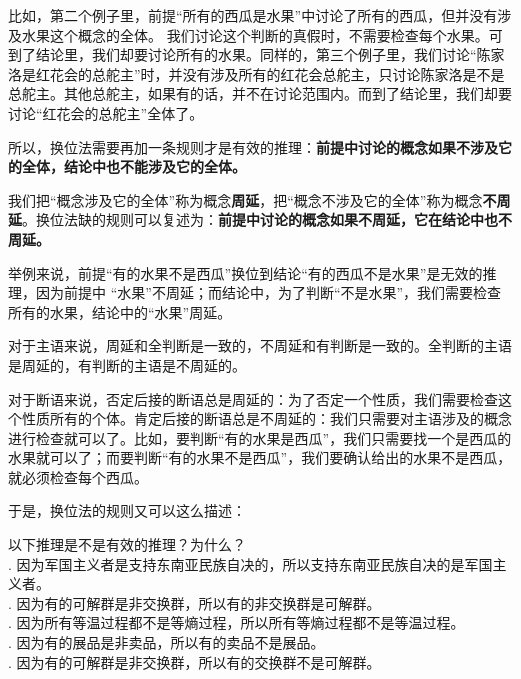\documentclass[12pt,UTF8]{ctexbook}
\begin{document}
比如，第二个例子里，前提“所有的西瓜是水果”中讨论了所有的西瓜，但并没有涉及水果这个概念的全体。
我们讨论这个判断的真假时，不需要检查每个水果。可到了结论里，我们却要讨论所有的水果。同样的，第三个例子里，我们讨论“陈家洛是红花会的总舵主”时，并没有涉及所有的红花会总舵主，只讨论陈家洛是不是总舵主。其他总舵主，如果有的话，并不在讨论范围内。而到了结论里，我们却要讨论“红花会的总舵主”全体了。

所以，换位法需要再加一条规则才是有效的推理：\textbf{前提中讨论的概念如果不涉及它的全体，结论中也不能涉及它的全体。}

我们把“概念涉及它的全体”称为概念\textbf{周延}，把“概念不涉及它的全体”称为概念\textbf{不周延}。换位法缺的规则可以复述为：\textbf{前提中讨论的概念如果不周延，它在结论中也不周延。}

举例来说，前提“有的水果不是西瓜”换位到结论“有的西瓜不是水果”是无效的推理，因为前提中
“水果”不周延；而结论中，为了判断“不是水果”，我们需要检查所有的水果，结论中的“水果”周延。

对于主语来说，周延和全判断是一致的，不周延和有判断是一致的。全判断的主语是周延的，有判断的主语是不周延的。

对于断语来说，否定后接的断语总是周延的：为了否定一个性质，我们需要检查这个性质所有的个体。肯定后接的断语总是不周延的：我们只需要对主语涉及的概念进行检查就可以了。比如，要判断“有的水果是西瓜”，我们只需要找一个是西瓜的水果就可以了；而要判断“有的水果不是西瓜”，我们要确认给出的水果不是西瓜，就必须检查每个西瓜。

于是，换位法的规则又可以这么描述：
\begin{center}
\end{center}

\begin{xt}\label{xt:2b-1-0}
    以下推理是不是有效的推理？为什么？\\
    . 因为军国主义者是支持东南亚民族自决的，所以支持东南亚民族自决的是军国主义者。 \\
    . 因为有的可解群是非交换群，所以有的非交换群是可解群。 \\
    . 因为所有等温过程都不是等熵过程，所以所有等熵过程都不是等温过程。 \\
    . 因为有的展品是非卖品，所以有的卖品不是展品。 \\
    . 因为有的可解群是非交换群，所以有的交换群不是可解群。
\end{xt}
\end{document}
